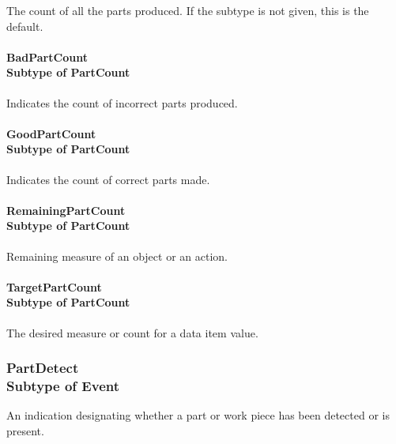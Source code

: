The count of all the parts produced.  If the subtype is not given, this is the default.

\paragraph[BadPartCount]{BadPartCount \\ {\small Subtype of PartCount}}\mbox{}
  \label{type:BadPartCount}

\FloatBarrier

Indicates the count of incorrect parts produced.

\paragraph[GoodPartCount]{GoodPartCount \\ {\small Subtype of PartCount}}\mbox{}
  \label{type:GoodPartCount}

\FloatBarrier

Indicates the count of correct parts made.

\paragraph[RemainingPartCount]{RemainingPartCount \\ {\small Subtype of PartCount}}\mbox{}
  \label{type:RemainingPartCount}

\FloatBarrier

Remaining measure of an object or an action.

\paragraph[TargetPartCount]{TargetPartCount \\ {\small Subtype of PartCount}}\mbox{}
  \label{type:TargetPartCount}

\FloatBarrier

The desired measure or count for a data item value.

\FloatBarrier
\subsubsection[PartDetect]{PartDetect \\ {\small Subtype of Event}}
  \label{type:PartDetect}

\FloatBarrier

An indication designating whether a part or work piece has been detected or is present.
  

